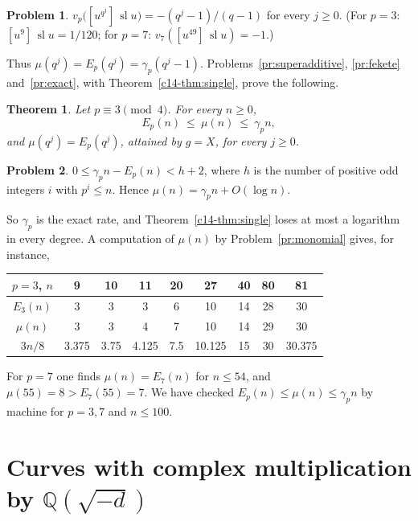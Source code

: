 \documentclass[reqno]{amsart}
\theoremstyle{definition}
\newtheorem{problem}{Problem}[section]
\theoremstyle{plain}
\newtheorem{theorem}{Theorem}[section]
\newcommand{\Q}{\mathbb{Q}}
\newcommand{\sll}{\operatorname{sl}}
\begin{document}
\begin{problem}\label{pr:coeff}
\(v_p\bigl([u^{q^j}]\, \sll u\bigr) = -(q^j - 1)/(q - 1)\) for every \(j \ge 0\).  (For \(p = 3\): \([u^9]\,\sll u = 1/120\); for \(p = 7\): \(v_7([u^{49}]\,\sll u) = -1\).)
\end{problem}

Thus \(\mu(q^j) = E_p(q^j) = \gamma_p(q^j - 1)\).  Problems~\ref{pr:superadditive}, \ref{pr:fekete} and~\ref{pr:exact}, with Theorem~\ref{c14-thm:single}, prove the following.

\begin{theorem}\label{thm:rate}
Let \(p \equiv 3 \pmod 4\).  For every \(n \ge 0\),
\[
  E_p(n) \ \le\ \mu(n) \ \le\ \gamma_p n ,
\]
and \(\mu(q^j) = E_p(q^j)\), attained by \(g = X\), for every \(j \ge 0\).
\end{theorem}

\begin{problem}\label{pr:gap}
\(0 \le \gamma_p n - E_p(n) < h + 2\), where \(h\) is the number of positive odd integers \(i\) with \(p^i \le n\).  Hence \(\mu(n) = \gamma_p n + O(\log n)\).
\end{problem}

So \(\gamma_p\) is the exact rate, and Theorem~\ref{c14-thm:single} loses at most a logarithm in every degree.  A computation of \(\mu(n)\) by Problem~\ref{pr:monomial} gives, for instance,
\begin{center}
\begin{tabular}{c|cccccccc}
\(p = 3\), \(n\) & 9 & 10 & 11 & 20 & 27 & 40 & 80 & 81 \\
\hline
\(E_3(n)\) & 3 & 3 & 3 & 6 & 10 & 14 & 28 & 30 \\
\(\mu(n)\) & 3 & 3 & 4 & 7 & 10 & 14 & 29 & 30 \\
\(3n/8\) & 3.375 & 3.75 & 4.125 & 7.5 & 10.125 & 15 & 30 & 30.375
\end{tabular}
\end{center}
For \(p = 7\) one finds \(\mu(n) = E_7(n)\) for \(n \le 54\), and \(\mu(55) = 8 > E_7(55) = 7\).  We have checked \(E_p(n) \le \mu(n) \le \gamma_p n\) by machine for \(p = 3, 7\) and \(n \le 100\).

\section{Curves with complex multiplication by \texorpdfstring{\(\Q(\sqrt{-d})\)}{Q(sqrt(-d))}}\label{sec:general}
\end{document}
